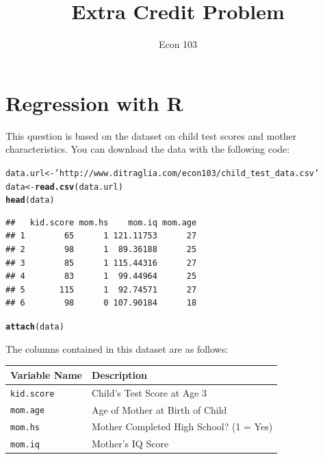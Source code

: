 \documentclass[addpoints,12pt]{exam}\usepackage[]{graphicx}\usepackage[]{color}
\title{Extra Credit Problem}
\author{Econ 103}
\date{}
\makeatletter
\newcommand{\hlstr}[1]{\textcolor[rgb]{0.192,0.494,0.8}{#1}}%
\newcommand{\hlstd}[1]{\textcolor[rgb]{0.345,0.345,0.345}{#1}}%
\newcommand{\hlkwb}[1]{\textcolor[rgb]{0.69,0.353,0.396}{#1}}%
\newcommand{\hlkwd}[1]{\textcolor[rgb]{0.737,0.353,0.396}{\textbf{#1}}}%
\newenvironment{kframe}{%
 \def\at@end@of@kframe{}%
 \ifinner\ifhmode%
  \def\at@end@of@kframe{\end{minipage}}%
  \begin{minipage}{\columnwidth}%
 \fi\fi%
 \def\FrameCommand##1{\hskip\@totalleftmargin \hskip-\fboxsep
 \colorbox{shadecolor}{##1}\hskip-\fboxsep
     \hskip-\linewidth \hskip-\@totalleftmargin \hskip\columnwidth}%
 \MakeFramed {\advance\hsize-\width
   \@totalleftmargin\z@ \linewidth\hsize
   \@setminipage}}%
 {\par\unskip\endMakeFramed%
 \at@end@of@kframe}
\newenvironment{knitrout}{}{} %
\makeatother
\begin{document}
\maketitle

\section*{Regression with R}
\begin{questions}

\question This question is based on the dataset on child test scores and mother characteristics. You can download the data with the following code:

\begin{knitrout}
\color{fgcolor}\begin{kframe}
\begin{alltt}
\hlstd{data.url} \hlkwb{<-} \hlstr{'http://www.ditraglia.com/econ103/child_test_data.csv'}
\hlstd{data} \hlkwb{<-} \hlkwd{read.csv}\hlstd{(data.url)}
\hlkwd{head}\hlstd{(data)}
\end{alltt}
\begin{verbatim}
##   kid.score mom.hs    mom.iq mom.age
## 1        65      1 121.11753      27
## 2        98      1  89.36188      25
## 3        85      1 115.44316      27
## 4        83      1  99.44964      25
## 5       115      1  92.74571      27
## 6        98      0 107.90184      18
\end{verbatim}
\begin{alltt}
\hlkwd{attach}\hlstd{(data)}
\end{alltt}
\end{kframe}
\end{knitrout}
\vspace{0.2in}
The columns contained in this dataset are as follows:
\begin{table}[h]
\centering
	\begin{tabular}{ll}
		Variable Name & Description\\
		\hline
		\texttt{kid.score}& Child's Test Score at Age 3\\
		\texttt{mom.age}&Age of Mother at Birth of Child\\
		\texttt{mom.hs}& Mother Completed High School? (1 = Yes)\\
		\texttt{mom.iq}& Mother's IQ Score
	\end{tabular}
\end{table}
\newpage
	\begin{parts}

\end{parts}
\end{questions}
\end{document}
